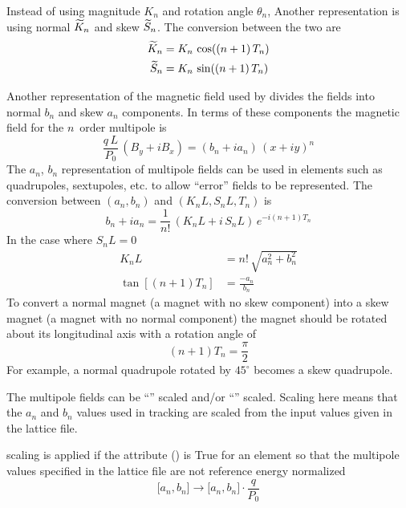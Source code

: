 Instead of using magnitude $K_n$ and rotation angle $\theta_n$, Another representation is using
normal $\widetilde K_n$ and skew $\widetilde S_n$. The conversion between the two are
\begin{align}
  \widetilde K_n &= K_n \, \cos((n + 1) \, T_n) \nonumber \\
  \widetilde S_n &= K_n \, \sin((n + 1) \, T_n) 
\end{align}

Another representation of the magnetic field used by \bmad divides the fields into normal $b_n$ and
skew $a_n$ components. In terms of these components the magnetic field for the $n$\Th\ order
multipole is
\begin{equation}
  \frac{q \, L}{P_0} \, (B_y + i B_x) = (b_n + i a_n) \, (x + i y)^n
  \label{qlpbb}
\end{equation}
The $a_n$, $b_n$ representation of multipole fields can be used in elements such as
quadrupoles, sextupoles, etc. to allow ``error'' fields to be represented.  
The conversion between $(a_n, b_n)$ and $(K_nL, S_nL, T_n)$ is
\begin{equation}
  b_n + i a_n = \frac{1}{n!} \, (K_nL + i \, S_nL) \, e^{-i(n+1)T_n}
\end{equation}
In the case where $S_nL = 0$
\begin{align}
  K_n L &= n! \, \sqrt{a_n^2 + b_n^2} \\
  \tan[(n+1) T_n] &= \frac{-a_n}{b_n}
\end{align}
To convert a normal magnet (a magnet with no skew component) into a skew magnet (a magnet with no
normal component) the magnet should be rotated about its longitudinal axis with a rotation angle of
\begin{equation}
  (n+1) T_n = \frac{\pi}{2}
\end{equation}
For example, a normal quadrupole rotated by $45^\circ$ becomes a skew quadrupole.

The multipole fields can be ``'' scaled and/or ``''
scaled.  Scaling here means that the $a_n$ and $b_n$ values used in tracking are scaled from the
input values given in the lattice file.

 scaling is applied if the  attribute ()
is True for an element so that the multipole values specified in the lattice file are not reference
energy normalized
\begin{equation}
  \bigl[ a_n, b_n \bigr] \longrightarrow
  \bigl[ a_n, b_n \bigr] \cdot \frac{q}{P_0}
  \label{ababq}
\end{equation}

